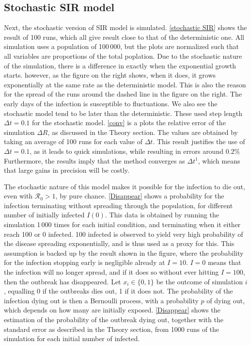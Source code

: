 \documentclass{article}
\begin{document}
    \subsection*{Stochastic SIR model}
    Next, the stochastic version of SIR model is simulated. \autoref{stochastic SIR} shows the result of 100 runs, which all give result close to that of the deterministic one. 
    All simulation uses a population of 100\,000, but the plots are normalized such that all variables are proportions of the total poplation.
    Due to the stochastic nature of the simulation, there is a difference in exactly when the exponential growth starts. 
    however, as the figure on the right shows, when it does, it grows exponentially at the same rate as the deterministic model. 
    This is also the reason for the spread of the runs around the dashed line in the figure on the right.
    The early days of the infection is susceptible to fluctuations.
    We also see the stochastic model tend to be later than the deterministic.
    These used step length $\Delta t = 0.1$ for the stochastic model. 
    \autoref{conv} is a plots the relative error of the simulation $\Delta R$, as discussed in the Theory section.
    The values are obtained by taking an average of 100 runs for each value of $\Delta t$.
    This result justifies the use of $\Delta t = 0.1$, as it leads to quick simulations, while resulting in errors around $0.2\%$
    Furthermore, the results imply that the method converges as $\Delta t^1$, which means that large gains in precision will be costly.
    
    The stochastic nature of this model makes it possible for the infection to die out, even with $\mathcal{R}_0>1$, by pure chance. 
    \autoref{Disappear} shows a probability for the infection terminating without spreading through the population, for different number of initially infected $I(0)$.
    This data is obtained by running the simulation 1\,000 times for each initial condition, and terminating when it either reach 100 or 0 infected.
    100 infected is observed to yield very high probability of the disease spreading exponentially, and is thus used as a proxy for this.
    This assumption is backed up by the result shown in the figure, where the probability for the infection stopping early is negligible already at $I=10$. 
    $I=0$ means that the infection will no longer spread, and if it does so without ever hitting $I=100$, then the outbreak has disappeared.
    Let $x_i\in\{0, 1\}$ be the outcome of simulation $i$, equalling 0 if the outbreaks dies out, 1 if it does not.
    The probability of the infection dying out is then a Bernoulli process, with a probability $p$ of dying out, which depends on how many are initially exposed.
    \autoref{Disappear} shows the estimation of the probability of the outbreak dying out, together with the standard error as described in the Theory section, from 1000 runs of the simulation for each initial number of infected.
\end{document}
